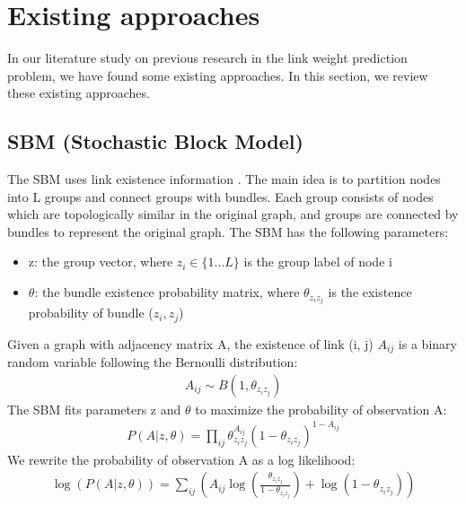 \documentclass{article} %
\begin{document}
\section{Existing approaches}
In our literature study on previous research in the link weight prediction problem,
we have found some existing approaches.
In this section, we review these existing approaches.

\subsection{SBM (Stochastic Block Model)}
The SBM uses link existence information \citep{holland1983stochastic}.
The main idea is to partition nodes into L groups and connect groups with bundles.
Each group consists of nodes which are topologically similar in the original graph, and groups are connected by bundles to represent the original graph.
The SBM has the following parameters:
\begin{itemize}
	\item z: the group vector,
	where $ z_i \in \{ 1 ... L \} $ is the group label of node i
	\item $ \theta $: the bundle existence probability matrix,
	where $ \theta_{z_i z_j} $ is the existence probability of bundle ($z_i, z_j$)
\end{itemize}
Given a graph with adjacency matrix A, the existence of link (i, j) $ A_{ij} $ is a binary random variable following the Bernoulli distribution:
\begin{align*}
A_{ij} \sim B(1, \theta_{z_i z_j})
\end{align*}
The SBM fits parameters z and $ \theta $
to maximize the probability of observation A:
\begin{align*}
P(A|z, \theta) 
= \prod_{ij} \theta_{z_i z_j}^{A_{ij}}(1-\theta_{z_i z_j})^{1-A_{ij}}
\end{align*}
We rewrite the probability of observation A as a log likelihood:
\begin{align*}
\log(P(A|z, \theta))
= \sum_{ij} (A_{ij} \log(\frac{\theta_{z_i z_j}}{1-\theta_{z_i z_j}}) + \log(1-\theta_{z_i z_j}))
\end{align*}
\end{document}
